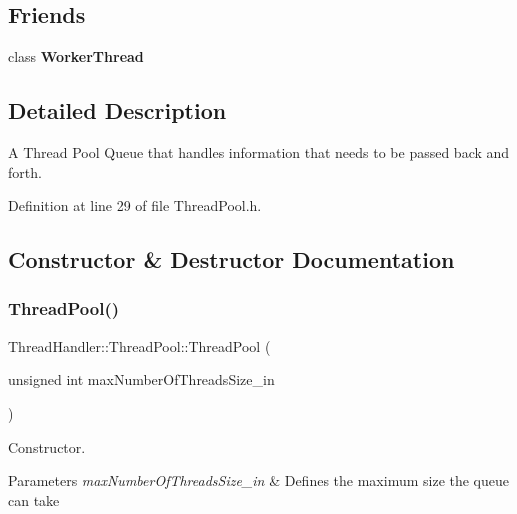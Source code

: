 \subsection*{Friends}
\begin{DoxyCompactItemize}
\item 
\mbox{\label{classThreadHandler_1_1ThreadPool_a5cd181bfe09cfad66e8f3d87feef1439}} 
class {\bfseries Worker\+Thread}
\end{DoxyCompactItemize}


\subsection{Detailed Description}
A Thread Pool Queue that handles information that needs to be passed back and forth. 

Definition at line 29 of file Thread\+Pool.\+h.



\subsection{Constructor \& Destructor Documentation}
\mbox{\label{classThreadHandler_1_1ThreadPool_ad9913356ca9ad725c316f80a74f946d4}} 
\subsubsection{\texorpdfstring{ThreadPool()}{ThreadPool()}\hspace{0.1cm}{\footnotesize\ttfamily [1/2]}}
{\footnotesize\ttfamily Thread\+Handler\+::\+Thread\+Pool\+::\+Thread\+Pool (\begin{DoxyParamCaption}\item[{unsigned int}]{max\+Number\+Of\+Threads\+Size\+\_\+in }\end{DoxyParamCaption})\hspace{0.3cm}{\ttfamily [explicit]}}



Constructor. 


\begin{DoxyParams}{Parameters}
{\em max\+Number\+Of\+Threads\+Size\+\_\+in} & Defines the maximum size the queue can take \\
\hline
\end{DoxyParams}


